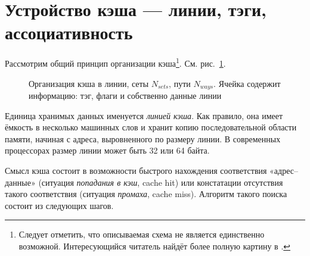 \section{Устройство кэша --- линии, тэги, ассоциативность}

Рассмотрим общий принцип организации кэша\footnote{Следует отметить, что описываемая схема не является единственно возможной. Интересующийся читатель найдёт более полную картину в \cite{hennessy-patterson}.}. См. рис.~\ref{fig:cache}.

\begin{figure}[htb]
    \centering
    \caption[Организация кэша в линии, сеты, пути]{Организация кэша в линии, сеты $N_{sets}$, пути $N_{ways}$. Ячейка содержит информацию: тэг, флаги и собственно данные линии}
    \label{fig:cache}
\end{figure}


Единица хранимых данных именуется \textit{линией кэша}. Как правило, она имеет ёмкость в несколько машинных слов и хранит копию последовательной области памяти, начиная с адреса, выровненного по размеру линии. В современных процессорах размер линии может быть 32 или 64 байта. 

Смысл кэша состоит в возможности быстрого нахождения соответствия «адрес--данные» (ситуация \textit{попадания в кэш}, \abbr cache hit) или констатации отсутствия такого соответствия (ситуация \textit{промаха}, \abbr cache miss). Алгоритм такого поиска состоит из следующих шагов.

